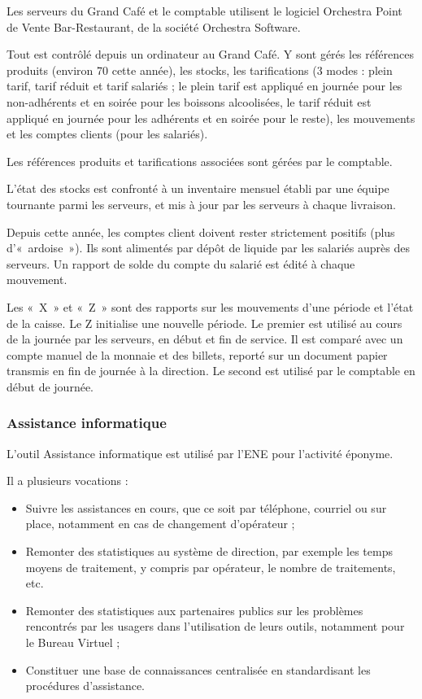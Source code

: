 Les serveurs du Grand Café et le comptable utilisent le logiciel Orchestra
Point de Vente Bar-Restaurant, de la société Orchestra Software.

Tout est contrôlé depuis un ordinateur au Grand Café. Y sont gérés les
références produits (environ 70 cette année), les stocks, les tarifications
(3 modes : plein tarif, tarif réduit et tarif salariés ; le plein tarif
est appliqué en journée pour les non-adhérents et en soirée pour les boissons
alcoolisées, le tarif réduit est appliqué en journée pour les adhérents
et en soirée pour le reste), les mouvements et les comptes clients (pour les
salariés).

Les références produits et tarifications associées sont gérées par le comptable.

L'état des stocks est confronté à un inventaire mensuel établi par une équipe
tournante parmi les serveurs, et mis à jour par les serveurs à chaque
livraison.

Depuis cette année, les comptes client doivent rester strictement positifs
(plus d'«~ardoise~»).
Ils sont alimentés par dépôt de liquide par les salariés auprès des serveurs.
Un rapport de solde du compte du salarié est édité à chaque mouvement.

Les «~X~» et «~Z~» sont des rapports sur les mouvements d'une période et
l'état de la caisse. Le Z initialise une nouvelle période.
Le premier est utilisé au cours de la journée par les serveurs, en début et fin
de service. Il est comparé avec un compte manuel de la monnaie et des billets,
reporté sur un document papier transmis en fin de journée à la direction.
Le second est utilisé par le comptable en début de journée.

\subsubsection{Assistance informatique}

L'outil Assistance informatique est utilisé par l'ENE pour l'activité éponyme.

Il a plusieurs vocations :
\begin{itemize}
\item Suivre les assistances en cours, que ce soit par téléphone,
      courriel ou sur place, notamment en cas de changement d'opérateur ;
\item Remonter des statistiques au système de direction, par exemple les temps
      moyens de traitement, y compris par opérateur, le nombre de traitements,
      etc.
\item Remonter des statistiques aux partenaires publics sur les problèmes
      rencontrés par les usagers dans l'utilisation de leurs outils, notamment
      pour le Bureau Virtuel ;
\item Constituer une base de connaissances centralisée en standardisant les
      procédures d'assistance.
\end{itemize}

